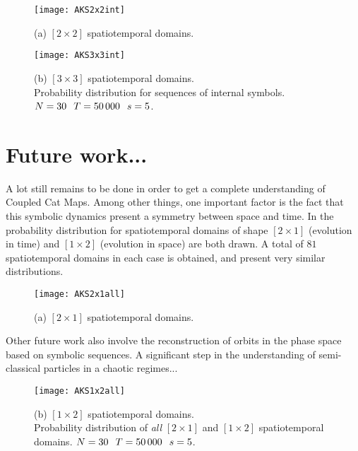 \begin{figure}[h]
\centering
\texttt{[image: AKS2x2int]}
\captionsetup{justification = centering}
\caption {\label{fig:AKS2x2int}
(a) $[2\!\times\!2]$ spatiotemporal domains.
    }
\end{figure}

\begin{figure}[h]
\ContinuedFloat
\centering
\texttt{[image: AKS3x3int]}
\captionsetup{justification = centering}
\caption{\label{fig:AKS3x3int}
(b) $[3\!\times\!3]$ spatiotemporal domains.
\\ Probability distribution for sequences of internal symbols.
\\ $N =30 \hskip 0.1in T = 50\,000 \hskip 0.1in s=5$.
}
\end{figure}

\section{Future work...}

A lot still remains to be done in order to get a complete understanding
of Coupled Cat Maps. Among other things, one important factor is the fact
that this symbolic dynamics present a symmetry between space and time. In
 the probability distribution for spatiotemporal domains of
shape $[2\!\times\!1]$ (evolution in time) and $[1\!\times\!2]$ (evolution in
space) are both drawn. A total of $81$ spatiotemporal domains in each case is
obtained, and present very similar distributions.

\begin{figure}[ht]
\centering
\texttt{[image: AKS2x1all]}
\captionsetup{justification = centering}
\caption{\label{fig:AKS2x1all}
(a) $[2\!\times\!1]$ spatiotemporal domains.
        }
\end{figure}

Other future work also involve the reconstruction of orbits in the phase
space based on symbolic sequences. A significant step in the
understanding of semi-classical particles in a chaotic regimes...

\begin{figure}[ht]
\ContinuedFloat
\centering
\texttt{[image: AKS1x2all]}
\captionsetup{justification = centering}
    \caption{\label{fig:AKS1x2al1}
(b) $[1\!\times\!2]$ spatiotemporal domains. \\
Probability distribution of {\em all} $[2\!\times\!1]$ and $[1\!\times\!2]$
spatiotemporal domains.
$N =30 \hskip 0.1in T = 50\,000  \hskip 0.1in s=5$.
             }
\end{figure}



\printbibliography[heading=subbibintoc,title={References}]
